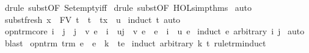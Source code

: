 \begin{isabellebody}
\isamarkupfalse%
\ {\isacharparenleft}drule\ subst{\isacharbrackleft}OF\ Set{\isachardot}empty{\isacharunderscore}iff{\isacharbrackright}{\isacharparenright}\isanewline
{}\isamarkupfalse%
\ {\isacharparenleft}drule\ subst{\isacharbrackleft}OF\ HOL{\isachardot}simp{\isacharunderscore}thms{\isacharparenleft}{}{}{\isacharparenright}{\isacharbrackright}{\isacharparenright}\isanewline
{}\isamarkupfalse%
\ auto%
\endisatagproof
{\isafoldproof}%
%
\isadelimproof
\isanewline
%
\endisadelimproof
\isanewline
{}\isamarkupfalse%
\ subst{\isacharunderscore}fresh{}{\isacharcolon}\ {\isachardoublequoteopen}x\ {\isasymnotin}\ FV\ t\ {\isasymLongrightarrow}\ t\ {\isacharequal}\ t{\isacharbrackleft}x\ {\isacharcolon}{\isacharcolon}{\isacharequal}\ u{\isacharbrackright}{\isachardoublequoteclose}\isanewline
%
\isadelimproof
%
\endisadelimproof
%
\isatagproof
{}\isamarkupfalse%
\ {\isacharparenleft}induct\ t{\isacharcomma}\ auto{\isacharparenright}%
\endisatagproof
{\isafoldproof}%
%
\isadelimproof
\isanewline
%
\endisadelimproof
\isanewline
{}\isamarkupfalse%
\ opn{\isacharunderscore}trm{\isacharunderscore}core{\isacharcolon}\ {\isachardoublequoteopen}i\ {\isasymnoteq}\ j\ {\isasymLongrightarrow}\ {\isacharbraceleft}j\ {\isasymrightarrow}\ v{\isacharbraceright}\ e\ {\isacharequal}\ {\isacharbraceleft}i\ {\isasymrightarrow}\ u{\isacharbraceright}{\isacharparenleft}{\isacharbraceleft}j\ {\isasymrightarrow}\ v{\isacharbraceright}\ e{\isacharparenright}\ {\isasymLongrightarrow}\ e\ {\isacharequal}\ {\isacharbraceleft}i\ {\isasymrightarrow}\ u{\isacharbraceright}\ e{\isachardoublequoteclose}\isanewline
%
\isadelimproof
%
\endisadelimproof
%
\isatagproof
{}\isamarkupfalse%
\ {\isacharparenleft}induct\ e\ arbitrary{\isacharcolon}\ i\ j{\isacharparenright}\isanewline
{}\isamarkupfalse%
\ auto\isanewline
{}\isamarkupfalse%
\ blast%
\endisatagproof
{\isafoldproof}%
%
\isadelimproof
\isanewline
%
\endisadelimproof
\isanewline
{}\isamarkupfalse%
\ opn{\isacharunderscore}trm{\isacharcolon}\ {\isachardoublequoteopen}trm\ e\ {\isasymLongrightarrow}\ e\ {\isacharequal}\ {\isacharbraceleft}k\ {\isasymrightarrow}\ t{\isacharbraceright}e{\isachardoublequoteclose}\isanewline
%
\isadelimproof
%
\endisadelimproof
%
\isatagproof
{}\isamarkupfalse%
\ {\isacharparenleft}induct\ arbitrary{\isacharcolon}\ k\ t\ rule{\isacharcolon}trm{\isachardot}induct{\isacharparenright}\isanewline
{}\isamarkupfalse%

\end{isabellebody}

